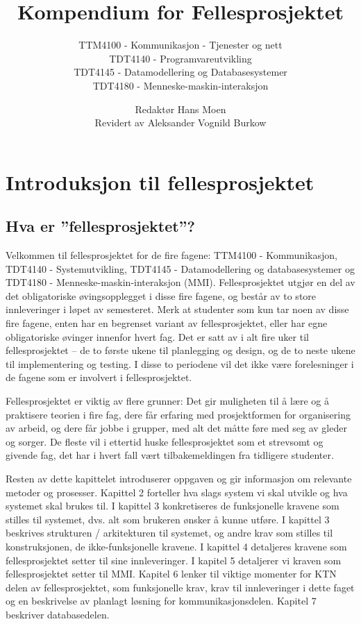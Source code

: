 \documentclass[a4paper]{scrartcl}
\title{Kompendium for Fellesprosjektet}
\subtitle{
TTM4100 - Kommunikasjon - Tjenester og nett \\
TDT4140 - Programvareutvikling \\
TDT4145 - Datamodellering og Databasesystemer \\
TDT4180 - Menneske-maskin-interaksjon
}
\author{
Redaktør Hans Moen \\
Revidert av Aleksander Vognild Burkow
}
\begin{document}
\maketitle
\thispagestyle{empty}
\newpage

\tableofcontents
\newpage

\section{Introduksjon til fellesprosjektet}
\subsection{Hva er ”fellesprosjektet”?}

Velkommen til fellesprosjektet for de fire fagene: TTM4100 - Kommunikasjon, TDT4140 - Systemutvikling, TDT4145 - Datamodellering og databasesystemer og TDT4180 - Menneske-maskin-interaksjon (MMI). Fellesprosjektet utgjør en del av det obligatoriske øvingsopplegget i disse fire fagene, og består av to store innleveringer i løpet av semesteret. Merk at studenter som kun tar noen av disse fire fagene, enten har en begrenset variant av fellesprosjektet, eller har egne obligatoriske øvinger innenfor hvert fag. Det er satt av i alt fire uker til fellesprosjektet – de to første ukene til planlegging og design, og de to neste ukene til implementering og testing. I disse to periodene vil det ikke være forelesninger i de fagene som er involvert i fellesprosjektet. 

Fellesprosjektet er viktig av flere grunner: Det gir muligheten til å lære og å praktisere teorien i fire fag, dere får erfaring med prosjektformen for organisering av arbeid, og dere får jobbe i grupper, med alt det måtte føre med seg av gleder og sorger. De fleste vil i ettertid huske fellesprosjektet som et strevsomt og givende fag, det har i hvert fall vært tilbakemeldingen fra tidligere studenter. 

Resten av dette kapittelet introduserer oppgaven og gir informasjon om relevante metoder og prosesser. Kapittel 2 forteller hva slags system vi skal utvikle og hva systemet skal brukes til. I kapittel 3 konkretiseres de funksjonelle kravene som stilles til systemet, dvs. alt som brukeren ønsker å kunne utføre. I kapittel 3 beskrives strukturen / arkitekturen til systemet, og andre krav som stilles til konstruksjonen, de ikke-funksjonelle kravene. I kapittel 4 detaljeres kravene som fellesprosjektet setter til sine innleveringer. I kapitel 5 detaljerer vi kraven som fellesprosjektet setter til MMI. Kapitel 6 lenker til viktige momenter for KTN delen av fellesprosjektet, som funksjonelle krav, krav til innleveringer i dette faget og en beskrivelse av planlagt løsning for kommunikasjonsdelen. Kapitel 7 beskriver databasedelen. 
\end{document}
